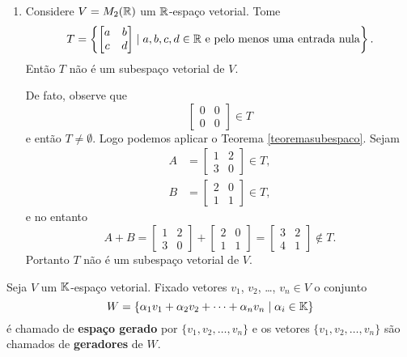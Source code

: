 \begin{exemplos}
\begin{enumerate}[label={\arabic*})]
    \item Considere $V = M_2(\mathbb{R})$ um $\mathbb{R}$-espaço vetorial. Tome
      \[
        T = \left\{
          \begin{bmatrix}
            a & b\\
            c & d
          \end{bmatrix}
          \mid a, b, c, d \in \mathbb{R} \mbox{ e pelo menos uma entrada nula}
        \right\}.
      \]
      Então $T$ não é um subespaço vetorial de $V$.
      \begin{solucao}
        De fato, observe que
        \[
          \begin{bmatrix}
            0 & 0\\
            0 & 0
          \end{bmatrix} \in T
        \]
        e então $T \ne \emptyset$. Logo podemos aplicar o Teorema \ref{teoremasubespaco}. Sejam
        \begin{align*}
          A &= \begin{bmatrix}1 & 2\\3 & 0\end{bmatrix} \in T,\\
          B &= \begin{bmatrix}2 & 0\\1 & 1\end{bmatrix} \in T,
        \end{align*}
        e no entanto
        \[
          A + B = \begin{bmatrix}1 & 2\\3 & 0\end{bmatrix} +
          \begin{bmatrix}2 & 0\\1 & 1\end{bmatrix} =
          \begin{bmatrix}3 & 2\\4 & 1 \end{bmatrix}\notin T.
        \]
        Portanto $T$ não é um subespaço vetorial de $V$.
      \end{solucao}
  \end{enumerate}
\end{exemplos}


\begin{definicao}
  Seja $V$ um $\mathbb{K}$-espaço vetorial. Fixado vetores $v_1$, $v_2$, \dots, $v_n \in V$ o conjunto
  \[
  W = \{\alpha_1v_1 + \alpha_2v_2 + \cdots + \alpha_nv_n \mid \alpha_i \in \mathbb{K}\}
  \]
  é chamado de \textbf{espaço gerado} por $\{v_1, v_2, \dots, v_n\}$ e os vetores $\{v_1, v_2, \dots, v_n\}$ são chamados de \textbf{geradores} de $W$.
\end{definicao}

